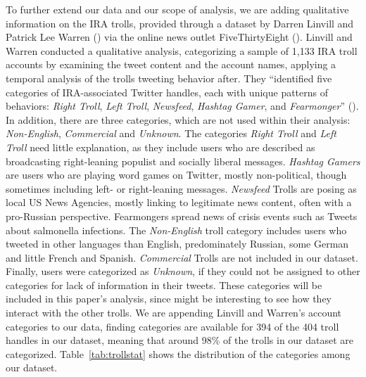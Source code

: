 \documentclass[12pt, titlepage=true, toc=bib]{scrartcl}
\begin{document}
To further extend our data and our scope of analysis, we are adding qualitative information on the IRA trolls, provided through a dataset by Darren Linvill and Patrick Lee Warren (\cite*{linvill_troll_2018}) via the online news outlet FiveThirtyEight (\cite{roeder_why_2018}). Linvill and Warren conducted a qualitative analysis, categorizing a sample of 1,133 IRA troll accounts by examining the tweet content and the account names, applying a temporal analysis of the trolls tweeting behavior after. They ``identified five categories of IRA-associated Twitter handles, each with unique patterns of behaviors: \textit{Right Troll}, \textit{Left Troll}, \textit{Newsfeed}, \textit{Hashtag Gamer}, and \textit{Fearmonger}'' (\cite[6]{linvill_troll_2018}). In addition, there are three categories, which are not used within their analysis: \textit{Non-English}, \textit{Commercial} and \textit{Unknown}. The categories \textit{Right Troll} and \textit{Left Troll} need little explanation, as they include users who are described as broadcasting right-leaning populist and socially liberal messages. \textit{Hashtag Gamers} are users who are playing word games on Twitter, mostly non-political, though sometimes including left- or right-leaning messages. \textit{Newsfeed} Trolls are posing as local US News Agencies, mostly linking to legitimate news content, often with a pro-Russian perspective. Fearmongers spread news of crisis events such as Tweets about salmonella infections. The \textit{Non-English} troll category includes users who tweeted in other languages than English, predominately Russian, some German and little French and Spanish. \textit{Commercial} Trolls are not included in our dataset. Finally, users were categorized as \textit{Unknown}, if they could not be assigned to other categories for lack of information in their tweets. These categories will be included in this paper's analysis, since might be interesting to see how they interact with the other trolls. We are appending Linvill and Warren's account categories to our data, finding categories are available for 394 of the 404 troll handles in our dataset, meaning that around 98\% of the trolls in our dataset are categorized. Table~\ref{tab:trollstat} shows the distribution of the categories among our dataset.
\end{document}

